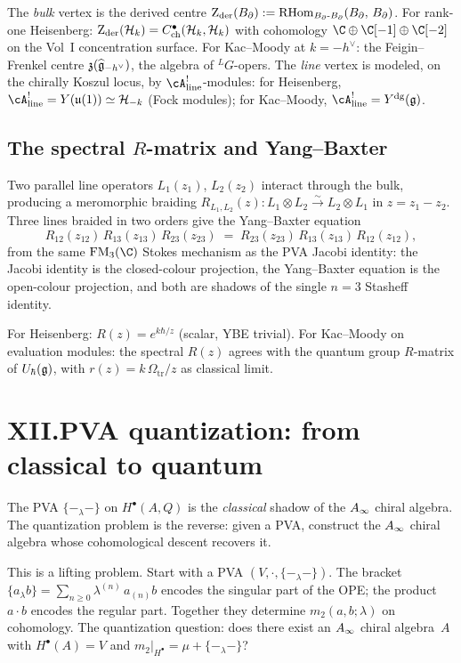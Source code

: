 The \emph{bulk} vertex is the derived centre
$\operatorname{Z}_{\mathrm{der}}(B_{\partial}) :=
\operatorname{RHom}_{B_{\partial}\text{-}B_{\partial}}(B_{\partial},\,B_{\partial})$.
For rank-one Heisenberg:
$\operatorname{Z}_{\mathrm{der}}(\mathcal{H}_k)=C^\bullet_{\mathrm{ch}}(\mathcal{H}_k,\mathcal{H}_k)$ with
cohomology $\C\oplus\C[-1]\oplus\C[-2]$ on the Vol~I concentration
surface.
For Kac--Moody at $k = -h^\vee$: the Feigin--Frenkel centre
$\mathfrak{z}(\widehat{\mathfrak{g}}_{-h^\vee})$, the algebra of
${}^L\!G$-opers. The \emph{line} vertex is modeled, on the
chirally Koszul locus, by $\cA^!_{\mathrm{line}}$-modules:
for Heisenberg,
$\cA^!_{\mathrm{line}} = Y(\mathfrak{u}(1)) \simeq \cH_{-k}$
(Fock modules); for Kac--Moody,
$\cA^!_{\mathrm{line}} = \Ydg(\fg)$.

\subsection*{The spectral $R$-matrix and Yang--Baxter}

Two parallel line operators $L_1(z_1)$, $L_2(z_2)$ interact
through the bulk, producing a meromorphic braiding
$R_{L_1, L_2}(z) \colon L_1 \otimes L_2
\xrightarrow{\sim}
L_2 \otimes L_1$ in $z = z_1 - z_2$.
Three lines braided in two orders give the Yang--Baxter equation
\[
R_{12}(z_{12})\,R_{13}(z_{13})\,R_{23}(z_{23})
\;=\;
R_{23}(z_{23})\,R_{13}(z_{13})\,R_{12}(z_{12}),
\]
from the same $\FM_3(\C)$ Stokes mechanism as the PVA Jacobi
identity: the Jacobi identity is the closed-colour projection,
the Yang--Baxter equation is the open-colour projection, and both
are shadows of the single $n = 3$ Stasheff identity.

For Heisenberg: $R(z) = e^{k\hbar/z}$ (scalar, YBE trivial).
For Kac--Moody on evaluation modules: the spectral $R(z)$ agrees
with the quantum group $R$-matrix of $U_\hbar(\mathfrak{g})$, with
$r(z) = k\,\Omega_{\mathrm{tr}}/z$ as classical limit.


\section*{XII.\quad PVA quantization: from classical to quantum}

The PVA $\{-_\lambda -\}$ on $H^\bullet(A, Q)$ is the
\emph{classical} shadow of the $A_\infty$ chiral algebra. The
quantization problem is the reverse: given a PVA, construct the
$A_\infty$ chiral algebra whose cohomological descent recovers it.

This is a lifting problem. Start with a PVA
$(V, \cdot, \{-_\lambda -\})$. The bracket
$\{a_\lambda b\} = \sum_{n \ge 0} \lambda^{(n)}\,a_{(n)}b$
encodes the singular part of the OPE; the product
$a \cdot b$ encodes the regular part. Together they determine
$m_2(a,b;\lambda)$ on cohomology. The quantization question: does
there exist an $A_\infty$ chiral algebra~$A$ with $H^\bullet(A) = V$
and $m_2|_{H^\bullet} = \mu + \{-_\lambda-\}$?

